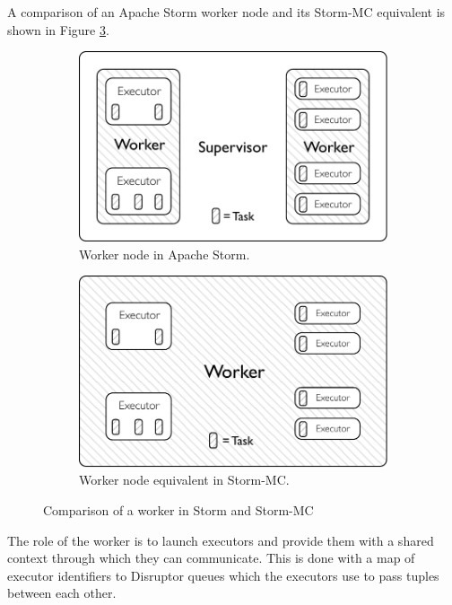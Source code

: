 A comparison of an Apache Storm worker node and its Storm-MC equivalent is shown in Figure \ref{fig:comparison}.

\begin{figure}[!htb]
\centering
\begin{subfigure}{.5\textwidth}
  \centering
  \includegraphics[width=0.95\linewidth]{pdf/distributed_worker.pdf}
  \caption{Worker node in Apache Storm.}
  \label{fig:comparison1}
\end{subfigure}%
\begin{subfigure}{.5\textwidth}
  \centering
  \includegraphics[width=0.95\linewidth]{pdf/local_worker.pdf}
  \caption{Worker node equivalent in Storm-MC.}
  \label{fig:comparison2}
\end{subfigure}
\caption{Comparison of a worker in Storm and Storm-MC}
\label{fig:comparison}
\end{figure}

The role of the worker is to launch executors and provide them with a shared context through which they can communicate. This is done with a map of executor identifiers to Disruptor queues which the executors use to pass tuples between each other.

